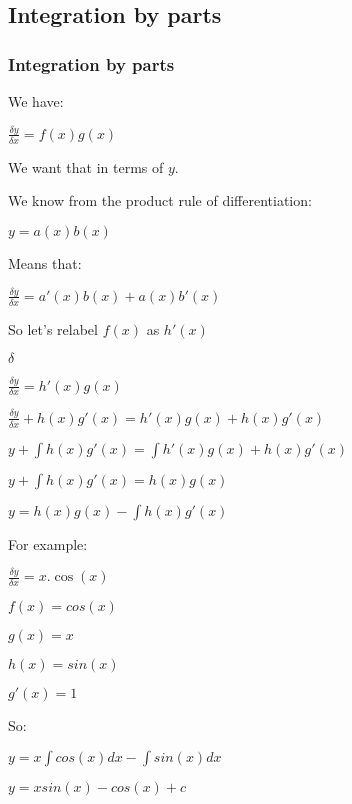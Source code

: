 
\subsection{Integration by parts}

\subsubsection{Integration by parts}

We have:

\(\frac{\delta y}{\delta x}=f(x)g(x)\)

We want that in terms of \(y\).

We know from the product rule of differentiation:

\(y=a(x)b(x)\)

Means that:

\(\frac{\delta y}{\delta x}=a'(x)b(x)+a(x)b'(x)\)

So let's relabel \(f(x)\) as \(h'(x)\)

\(\delta\)

\(\frac{\delta y}{\delta x}=h'(x)g(x)\)

\(\frac{\delta y}{\delta x}+h(x)g'(x)=h'(x)g(x)+h(x)g'(x)\)

\(y+\int h(x)g'(x)=\int h'(x)g(x)+h(x)g'(x)\)

\(y+\int h(x)g'(x)=h(x)g(x)\)

\(y=h(x)g(x)-\int h(x)g'(x)\)

For example:

\(\frac{\delta y}{\delta x}=x.\cos(x)\)

\(f(x)=cos(x)\)

\(g(x)=x\)

\(h(x)=sin(x)\)

\(g'(x)=1\)

So:

\(y=x\int cos(x) dx-\int sin(x)dx\)

\(y=xsin(x)-cos(x)+c\)

